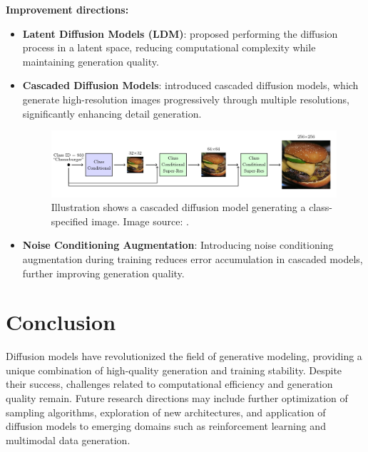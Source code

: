 \documentclass[sigconf,natbib=false]{acmart}
\begin{document}
\textbf{Improvement directions:}
\begin{itemize}
  \item \textbf{Latent Diffusion Models (LDM)}:
  \cite[Rombach \& Blattmann et al. (2022)]{rombach2022}
  proposed performing the diffusion process in a latent space,
  reducing computational complexity while maintaining generation quality.
  \item \textbf{Cascaded Diffusion Models}:
  \cite[Ho et al. (2021)]{ho2021} introduced cascaded diffusion models,
  which generate high-resolution images progressively through multiple resolutions,
  significantly enhancing detail generation.
  \begin{figure}[h]
    \centering
    \includegraphics[width=\linewidth]{imgs/210615282-F4.png}
    \caption{Illustration shows a cascaded diffusion model generating a class-specified image.
    Image source: \cite[Ho et al. (2021)]{ho2021}.}
    \Description{}
  \end{figure}
  \item \textbf{Noise Conditioning Augmentation}:
  Introducing noise conditioning augmentation during training reduces error accumulation
  in cascaded models, further improving generation quality.
\end{itemize}

\section{Conclusion}
Diffusion models have revolutionized the field of generative modeling,
providing a unique combination of high-quality generation and training stability.
Despite their success, challenges related to computational efficiency and generation quality remain.
Future research directions may include further optimization of sampling algorithms,
exploration of new architectures, and application of diffusion models to emerging domains
such as reinforcement learning and multimodal data generation.

\printbibliography
\end{document}
